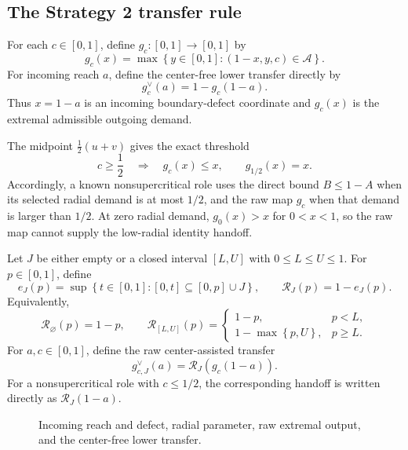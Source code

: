 \subsection{The Strategy 2 transfer rule}

\begin{definition}
\label{def:body-transfer-alphabet}
For each $c\in[0,1]$, define $g_c:[0,1]\to[0,1]$ by
\[
 g_c(x)=
 \max\left\{y\in[0,1]:(1-x,y,c)\in\mathcal A\right\}.
\]
For incoming reach $a$, define the center-free lower transfer directly by
\[
 g_c^\vee(a)=1-g_c(1-a).
\]
Thus $x=1-a$ is an incoming boundary-defect coordinate and $g_c(x)$ is the
extremal admissible outgoing demand.
\end{definition}

The midpoint $\frac12(u+v)$ gives the exact threshold
\begin{equation}
 c\ge\frac12\quad\Longrightarrow\quad g_c(x)\le x,
 \qquad
 g_{1/2}(x)=x.
 \label{eq:body-midpoint-threshold}
\end{equation}
Accordingly, a known nonsupercritical role uses the direct bound $B\le1-A$
when its selected radial demand is at most $1/2$, and the raw map $g_c$ when
that demand is larger than $1/2$.  At zero radial demand,
$g_0(x)>x$ for $0<x<1$, so the raw map cannot supply the low-radial identity
handoff.

\begin{definition}
\label{def:body-center-assisted-transfer}
Let $J$ be either empty or a closed interval $[L,U]$ with
$0\le L\le U\le1$.  For $p\in[0,1]$, define
\[
 e_J(p)=
 \sup\left\{t\in[0,1]:[0,t]\subseteq[0,p]\cup J\right\},
 \qquad
 \mathcal R_J(p)=1-e_J(p).
\]
Equivalently,
\[
 \mathcal R_\varnothing(p)=1-p,
\qquad
 \mathcal R_{[L,U]}(p)=
 \begin{cases}
 1-p,&p<L,\\
 1-\max\left\{p,U\right\},&p\ge L.
 \end{cases}
\]
For $a,c\in[0,1]$, define the raw center-assisted transfer
\[
 g_{c,J}^\vee(a)=\mathcal R_J(g_c(1-a)).
\]
For a nonsupercritical role with $c\le1/2$, the corresponding handoff is
written directly as $\mathcal R_J(1-a)$.
\end{definition}

\begin{figure}[H]
\centering
\resizebox{.92\linewidth}{!}{}
\caption{Incoming reach and defect, radial parameter, raw extremal output,
and the center-free lower transfer.}
\label{fig:transfer-vtriangle-skeleton}
\end{figure}

